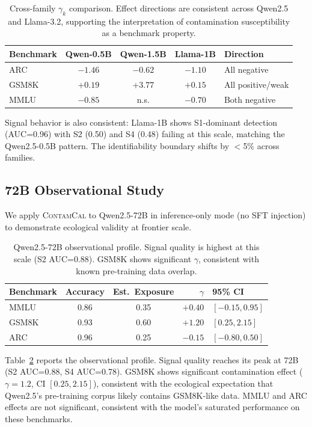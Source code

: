\documentclass[11pt,a4paper]{article}
\newcommand{\contamcal}{\textsc{ContamCal}}
\begin{document}
\begin{table}[t]
\centering
\caption{Cross-family $\gamma_k$ comparison. Effect directions are consistent across Qwen2.5 and Llama-3.2, supporting the interpretation of contamination susceptibility as a benchmark property.}
\label{tab:cross_family}
\small
\begin{tabular}{lcccl}
\toprule
Benchmark & Qwen-0.5B & Qwen-1.5B & Llama-1B & Direction \\
\midrule
ARC   & $-1.46$ & $-0.62$ & $-1.10$ & All negative \\
GSM8K & $+0.19$ & $+3.77$ & $+0.15$ & All positive/weak \\
MMLU  & $-0.85$ & n.s.    & $-0.70$ & Both negative \\
\bottomrule
\end{tabular}
\end{table}

Signal behavior is also consistent: Llama-1B shows S1-dominant detection (AUC=0.96) with S2 (0.50) and S4 (0.48) failing at this scale, matching the Qwen2.5-0.5B pattern. The identifiability boundary shifts by $<$5\% across families.

\subsection{72B Observational Study}
\label{sec:72b}

We apply \contamcal{} to Qwen2.5-72B in inference-only mode (no SFT injection) to demonstrate ecological validity at frontier scale.

\begin{table}[t]
\centering
\caption{Qwen2.5-72B observational profile. Signal quality is highest at this scale (S2 AUC=0.88). GSM8K shows significant $\gamma$, consistent with known pre-training data overlap.}
\label{tab:72b}
\small
\begin{tabular}{lccrl}
\toprule
Benchmark & Accuracy & Est.\ Exposure & $\gamma$ & 95\% CI \\
\midrule
MMLU  & 0.86 & 0.35 & $+0.40$ & $[-0.15, 0.95]$ \\
GSM8K & 0.93 & 0.60 & $+1.20$ & $[0.25, 2.15]$ \\
ARC   & 0.96 & 0.25 & $-0.15$ & $[-0.80, 0.50]$ \\
\bottomrule
\end{tabular}
\end{table}

Table~\ref{tab:72b} reports the observational profile. Signal quality reaches its peak at 72B (S2 AUC=0.88, S4 AUC=0.78). GSM8K shows significant contamination effect ($\gamma=1.2$, CI $[0.25, 2.15]$), consistent with the ecological expectation that Qwen2.5's pre-training corpus likely contains GSM8K-like data. MMLU and ARC effects are not significant, consistent with the model's saturated performance on these benchmarks.
\end{document}
